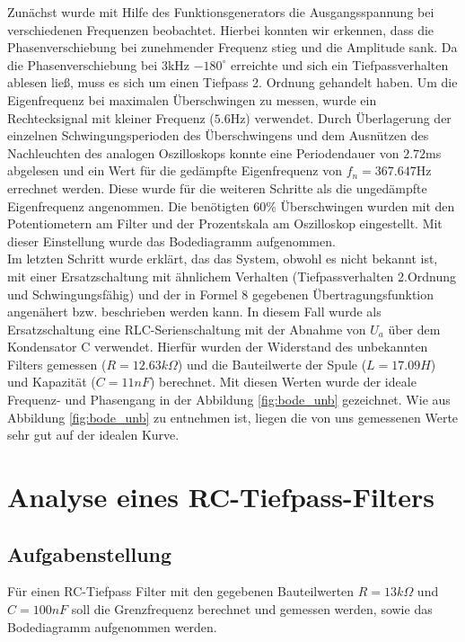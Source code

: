 \documentclass[12pt,a4paper,ngerman]{article}
\begin{document}
Zunächst wurde mit Hilfe des Funktionsgenerators die Ausgangsspannung bei verschiedenen Frequenzen beobachtet. Hierbei konnten wir erkennen, dass die Phasenverschiebung bei zunehmender Frequenz stieg und die Amplitude sank. Da die Phasenverschiebung bei 3kHz $-180^\circ$ erreichte und sich ein Tiefpassverhalten ablesen ließ, muss es sich um einen Tiefpass 2. Ordnung gehandelt haben.
Um die Eigenfrequenz bei maximalen Überschwingen zu messen, wurde ein Rechtecksignal mit kleiner Frequenz ($5.6$Hz) verwendet. Durch Überlagerung der einzelnen Schwingungsperioden des Überschwingens und dem Ausnützen des Nachleuchten des analogen Oszilloskops konnte eine Periodendauer von $2.72$ms abgelesen und ein Wert für die gedämpfte Eigenfrequenz von $f_n = 367.647$Hz errechnet werden. Diese wurde für die weiteren Schritte als die ungedämpfte Eigenfrequenz angenommen.
Die benötigten 60\% Überschwingen wurden mit den Potentiometern am Filter und der Prozentskala am Oszilloskop eingestellt. Mit dieser Einstellung wurde das Bodediagramm aufgenommen.\\
Im letzten Schritt wurde erklärt, das das System, obwohl es nicht bekannt ist, mit einer Ersatzschaltung mit ähnlichem Verhalten (Tiefpassverhalten 2.Ordnung und Schwingungsfähig) und der in Formel 8 gegebenen Übertragungsfunktion angenähert bzw. beschrieben werden kann. In diesem Fall wurde als Ersatzschaltung eine RLC-Serienschaltung mit der Abnahme von $U_a$ über dem Kondensator C verwendet. Hierfür wurden der Widerstand des unbekannten Filters gemessen ($R = 12.63k\Omega$) und die Bauteilwerte der Spule ($L = 17.09H$) und Kapazität ($C = 11nF$) berechnet. Mit diesen Werten wurde der ideale Frequenz- und Phasengang in der Abbildung \ref{fig:bode_unb} gezeichnet. Wie aus Abbildung \ref{fig:bode_unb} zu entnehmen ist, liegen die von uns gemessenen Werte sehr gut auf der idealen Kurve.



\pagebreak
\section{Analyse eines RC-Tiefpass-Filters}
\subsection{Aufgabenstellung}
Für einen RC-Tiefpass Filter mit den gegebenen Bauteilwerten $R = 13k\Omega$ und $C = 100 nF$ soll die Grenzfrequenz berechnet und gemessen werden, sowie das Bodediagramm aufgenommen werden.
\end{document}
